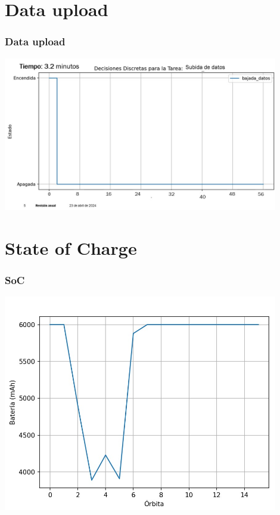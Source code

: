 \documentclass[10pt]{beamer}
\begin{document}
\section{Data upload}
\begin{frame}
  \frametitle{Data upload}
  \centering
  \href{https://github.com/EnigmaK9/linx/tree/main/06-progress_04_22_2024/padilla-villanueva/sql}{\includegraphics[width=0.9\textwidth]{subida-de-datos.jpeg}}
\end{frame}

\section{State of Charge}
\begin{frame}
  \frametitle{SoC}
  \centering
  \href{https://github.com/EnigmaK9/linx/tree/main/06-progress_04_22_2024/padilla-villanueva/sql}{\includegraphics[width=0.9\textwidth]{bateria-orbita.jpeg}}
\end{frame}
\end{document}
